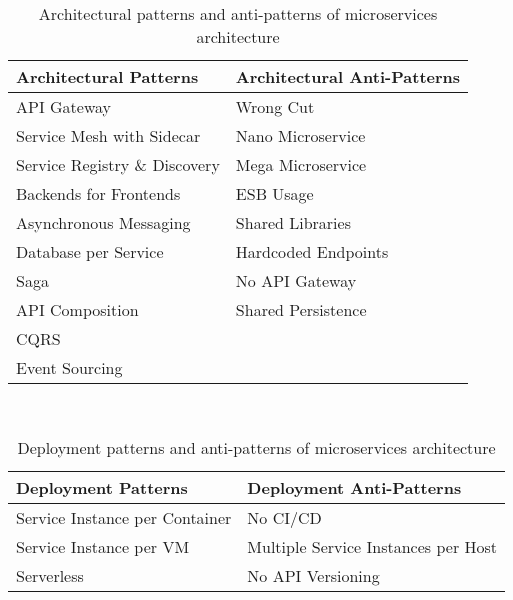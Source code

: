 \documentclass[11pt,a4paper,twocolumn]{article}
\begin{document}
\begin{table}[H]
\centering 
    \begin{tabular}{ 
  | >{\centering\arraybackslash} m{9em} 
  | >{\centering\arraybackslash} m{9em} | }
    \hline
    \rowcolor{bluepoli!40}
    \textbf{Architectural Patterns} & \textbf{Architectural Anti-Patterns}\T\B \\
    \hline \hline
    API Gateway & Wrong Cut\T\B\\
    \hline
    \rowcolor{bluepoli!10}
    Service Mesh with Sidecar & Nano Microservice\T\B\\
    \hline
    Service Registry \& Discovery & Mega Microservice\T\B\\
    \hline
    \rowcolor{bluepoli!10}
    Backends for Frontends & ESB Usage\T\B\\
    \hline
    Asynchronous Messaging & Shared Libraries\T\B\\
    \hline
    \rowcolor{bluepoli!10}
    Database per Service & Hardcoded Endpoints \T\B\\
    \hline
    Saga & No API Gateway \T\B\\
    \hline
    \rowcolor{bluepoli!10}
    API Composition & Shared Persistence \T\B\\
    \hline
    CQRS & \T\B\\
    \hline
    \rowcolor{bluepoli!10}
    Event Sourcing & \T\B\\
    \hline
    \end{tabular}
    \\[10pt]
    \caption{Architectural patterns and anti-patterns of microservices architecture}
    \label{table:pattern_table_1}
\end{table}

\begin{table}[H]
\centering 
    \begin{tabular}{ 
  | >{\centering\arraybackslash} m{9em} 
  | >{\centering\arraybackslash} m{9em} | }
    \hline
    \rowcolor{bluepoli!40}
    \textbf{Deployment Patterns} & \textbf{Deployment Anti-Patterns}\T\B \\
    \hline \hline
    Service Instance per Container & No CI/CD\T\B\\
    \hline
    \rowcolor{bluepoli!10}
    Service Instance per VM & Multiple Service Instances per Host\T\B\\
    \hline
    Serverless & No API Versioning \T\B\\
    \hline
    \end{tabular}
    \\[10pt]
    \caption{Deployment patterns and anti-patterns of microservices architecture}
    \label{table:pattern_table_2}
\end{table}
\end{document}
